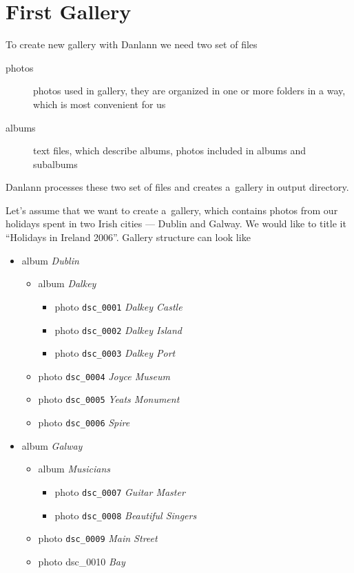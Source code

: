 \documentclass{article}
\begin{document}
\section{First Gallery}\label{example}
To create new gallery with Danlann we need two set of files
\begin{description}
\item[photos] photos used in gallery, they are organized in one or more
folders in a way, which is most convenient for us
\item[albums] text files, which describe albums, photos included in albums
    and subalbums
\end{description}
Danlann processes these two set of files and creates a~gallery in output
directory.

Let's assume that we want to create a~gallery, which contains photos from
our holidays spent in two Irish cities --- Dublin and Galway. We would like
to title it ``Holidays in Ireland 2006''. Gallery structure can look like
\begin{itemize}
\item album \textit{Dublin}
    \begin{itemize}
    \item album \textit{Dalkey}
        \begin{itemize}
        \item photo \texttt{dsc\_0001} \textit{Dalkey Castle}
        \item photo \texttt{dsc\_0002} \textit{Dalkey Island}
        \item photo \texttt{dsc\_0003} \textit{Dalkey Port}
        \end{itemize}
    \item photo \texttt{dsc\_0004} \textit{Joyce Museum}
    \item photo \texttt{dsc\_0005} \textit{Yeats Monument}
    \item photo \texttt{dsc\_0006} \textit{Spire}
    \end{itemize}
\item album \textit{Galway}
    \begin{itemize}
    \item album \textit{Musicians}
        \begin{itemize}
        \item photo \texttt{dsc\_0007} \textit{Guitar Master}
        \item photo \texttt{dsc\_0008} \textit{Beautiful Singers}
        \end{itemize}
    \item photo \texttt{dsc\_0009} \textit{Main Street}
    \item photo dsc\_0010 \textit{Bay}
    \end{itemize}
\end{itemize}
\end{document}
